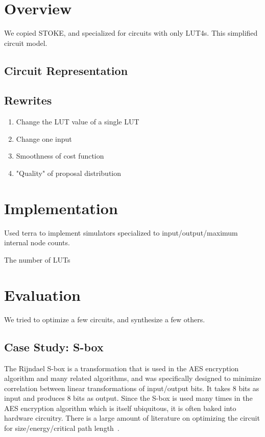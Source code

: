 \documentclass{article}
\begin{document}
\section{Overview}
We copied STOKE, and specialized for circuits with only LUT4s. This simplified circuit model.

\subsection{Circuit Representation}

\subsection{Rewrites}
\begin{enumerate}
  \item Change the LUT value of a single LUT
  \item Change one input
  \item Smoothness of cost function
  \item "Quality" of proposal distribution
\end{enumerate}

\section{Implementation}
Used terra \cite{DeVito2013} to implement simulators specialized to input/output/maximum internal node counts.

The number of LUTs

\section{Evaluation}
We tried to optimize a few circuits, and synthesize a few others.


\subsection{Case Study: S-box}

The Rijndael S-box is a transformation that is used in the AES encryption algorithm and many related algorithms, and was specifically designed to minimize correlation between linear transformations of input/output bits. It takes 8 bits as input and produces 8 bits as output. Since the S-box is used many times in the AES encryption algorithm which is itself ubiquitous, it is often baked into hardware circuitry. There is a large amount of literature on optimizing the circuit for size/energy/critical path length~\cite{morioka2002optimized,canright2005very,boyar2011depth}.
\end{document}
